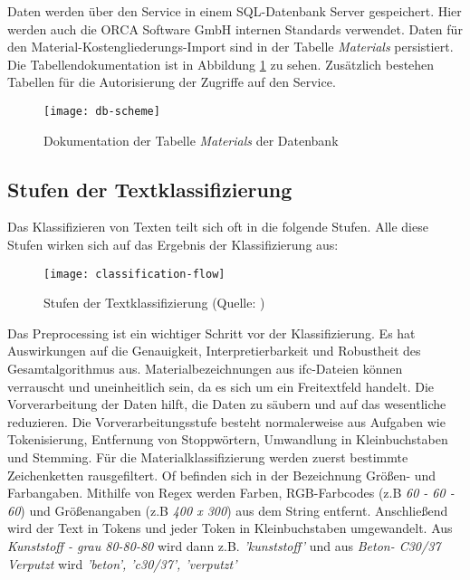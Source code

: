 Daten werden über den Service in einem SQL-Datenbank Server gespeichert. Hier werden auch die ORCA Software GmbH internen Standards verwendet. Daten für den Material-Kostengliederungs-Import sind in der Tabelle \textit{Materials} persistiert. Die Tabellendokumentation ist in Abbildung \ref{fig:db-scheme} zu sehen. Zusätzlich bestehen Tabellen für die Autorisierung der Zugriffe auf den Service.

\begin{figure}[H]
	\centering
	\texttt{[image: db-scheme]}
	\caption[Dokumentation]{Dokumentation der Tabelle \textit{Materials} der Datenbank}
	\label{fig:db-scheme}
\end{figure}
\subsection{Stufen der Textklassifizierung}
\label{c:conception:preprocessing}

Das Klassifizieren von Texten teilt sich oft in die folgende Stufen. Alle diese Stufen wirken sich auf das Ergebnis der Klassifizierung aus:

\begin{figure}[H]
	\centering
	\texttt{[image: classification-flow]}
	\caption[Textklassifizierung]{Stufen der Textklassifizierung (Quelle:  \cite{Foram_2016})}
	\label{fig:classification flow}
\end{figure}

 Das Preprocessing ist ein wichtiger Schritt vor der Klassifizierung. Es hat Auswirkungen auf die Genauigkeit, Interpretierbarkeit und Robustheit des Gesamtalgorithmus aus. \citep{Zelaya_2019} Materialbezeichnungen aus \ac{ifc}-Dateien können verrauscht und uneinheitlich sein, da es sich um ein Freitextfeld handelt. Die Vorverarbeitung der Daten hilft, die Daten zu säubern und auf das wesentliche reduzieren. \citep{Priyanga_2016}
 Die Vorverarbeitungsstufe besteht normalerweise aus Aufgaben wie Tokenisierung, Entfernung von Stoppwörtern, Umwandlung in Kleinbuchstaben und Stemming. \citep{Uysal_2014}
Für die Materialklassifizierung werden zuerst bestimmte Zeichenketten rausgefiltert. Of befinden sich in der Bezeichnung Größen- und Farbangaben.
Mithilfe von Regex werden Farben, RGB-Farbcodes (z.B \textit{60 - 60 - 60}) und Größenangaben (z.B \textit{400 x 300}) aus dem String entfernt. Anschließend wird der Text in Tokens und jeder Token in Kleinbuchstaben umgewandelt. Aus \textit{\glqq Kunststoff - grau 80-80-80\grqq{}} wird dann z.B. \textit{\glqq 'kunststoff'\grqq{}} und aus \textit{\glqq Beton- C30/37 Verputzt\grqq{}} wird \textit{\glqq 'beton', 'c30/37', 'verputzt'\grqq{}}

